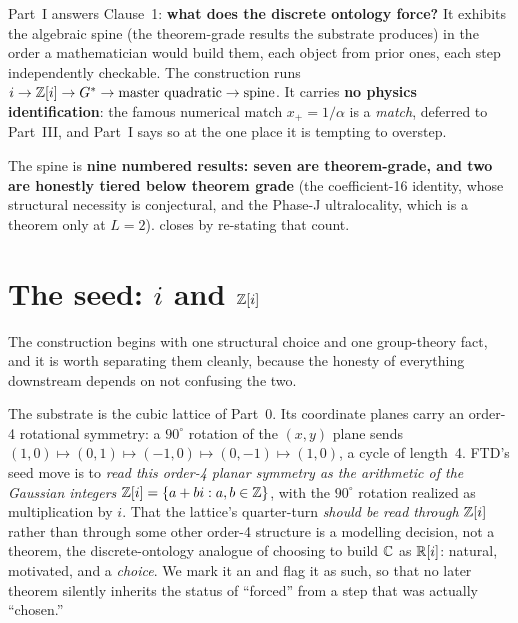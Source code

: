 \noindent Part~I answers Clause~1: \textbf{what does the discrete ontology
force?} It exhibits the algebraic spine (the theorem-grade results the
substrate produces) in the order a mathematician would build them, each
object from prior ones, each step independently checkable. The construction runs
$i \to \mathbb{Z}[i] \to G^{*} \to \text{master quadratic} \to \text{spine}$. It carries
\textbf{no physics identification}: the famous numerical match $x_+ = 1/\alpha$
is a \emph{match}, deferred to Part~III, and Part~I says so at the one place it
is tempting to overstep.

\medskip
\noindent The spine is \textbf{nine numbered results: seven are theorem-grade,
and two are honestly tiered below theorem grade} (the coefficient-16 identity,
whose structural necessity is conjectural, and the Phase-J ultralocality, which
is a theorem only at $L=2$).  closes by re-stating that count.

\section{The seed: \texorpdfstring{$i$}{i} and \texorpdfstring{$\mathbb{Z}[i]$}{Z[i]}}\label{sec:seed}
The construction begins with one structural choice and one group-theory fact,
and it is worth separating them cleanly, because the honesty of everything
downstream depends on not confusing the two.

 The substrate is the cubic lattice of
Part~0. Its coordinate planes carry an order-4 rotational symmetry: a $90^\circ$
rotation of the $(x,y)$ plane sends
$(1,0)\mapsto(0,1)\mapsto(-1,0)\mapsto(0,-1)\mapsto(1,0)$, a cycle of length~4.
FTD's seed move is to \emph{read this order-4 planar symmetry as the arithmetic
of the Gaussian integers} $\mathbb{Z}[i]=\{a+bi : a,b\in\mathbb{Z}\}$, with the $90^\circ$ rotation
realized as multiplication by $i$. That the lattice's quarter-turn \emph{should
be read through} $\mathbb{Z}[i]$ rather than through some other order-4 structure is a
modelling decision, not a theorem, the discrete-ontology analogue of choosing
to build $\mathbb{C}$ as $\mathbb{R}[i]$: natural, motivated, and a \emph{choice}. We mark it an
 and flag it as such, so that no later theorem silently inherits the
status of ``forced'' from a step that was actually ``chosen.''

